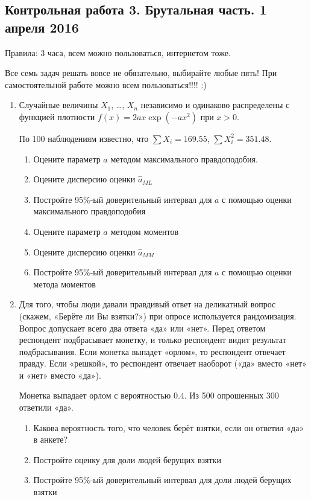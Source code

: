 \documentclass[12pt, a4paper]{article}\usepackage[]{graphicx}\usepackage[]{color}
\begin{document}
						\subsection{Контрольная работа 3. Брутальная часть. 1 апреля 2016}

						Правила: 3 часа, всем можно пользоваться, интернетом тоже.

						Все семь задач решать вовсе не обязательно, выбирайте любые пять! При самостоятельной работе можно всем пользоваться!!!! :)

						\begin{enumerate}

							\item Случайные величины $X_1$, \ldots, $X_n$ независимо и одинаково распределены с функцией плотности $f(x)=2ax\exp(-ax^2)$ при $x>0$.



							По 100 наблюдениям известно, что $\sum X_i = 169.55$, $\sum X_i^2 = 351.48$.

							\begin{enumerate}
								\item Оцените параметр $a$ методом максимального правдоподобия.
								\item Оцените дисперсию оценки $\hat a_{ML}$
								\item Постройте 95\%-ый доверительный интервал для $a$ с помощью оценки максимального правдоподобия
								\item Оцените параметр $a$ методом моментов
								\item Оцените дисперсию оценки $\hat a_{MM}$
								\item Постройте 95\%-ый доверительный интервал для $a$ с помощью оценки метода моментов
							\end{enumerate}

							\item Для того, чтобы люди давали правдивый ответ на деликатный вопрос (скажем, «Берёте ли Вы взятки?») при опросе используется рандомизация. Вопрос допускает всего два ответа «да» или «нет». Перед ответом респондент подбрасывает монетку, и только респондент видит результат подбрасывания. Если монетка выпадет «орлом», то респондент отвечает правду. Если «решкой», то респондент отвечает наоборот («да» вместо «нет» и «нет» вместо «да»).

							Монетка выпадает орлом с вероятностью $0.4$. Из 500 опрошенных 300 ответили «да».

							\begin{enumerate}
								\item Какова вероятность того, что человек берёт взятки, если он ответил «да» в анкете?
								\item Постройте оценку для доли людей берущих взятки
								\item Постройте 95\%-ый доверительный интервал для доли людей берущих взятки
							\end{enumerate}


\end{enumerate}
\end{document}
